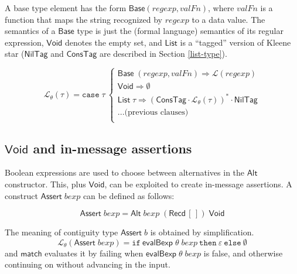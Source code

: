 \documentclass[a4paper,UKenglish,cleveref, autoref, thm-restate]{lipics-v2021}
\newcommand{\konst}[1]{\ensuremath{\mathsf{#1}}}
\newcommand{\Lang}[1]{\ensuremath{{\mathcal L}({#1})}}
\newcommand{\LangTheta}[1]{\ensuremath{{\mathcal L}_{\theta}({#1})}}
\newcommand{\itelse}[3]{\mbox{$\mathtt{if}\ {#1}\ \mathtt{then}\ {#2}\ \mathtt{else}\ {#3}$}}
\begin{document}
\begin{definition}

A base type element has the form
$\konst{Base}(\mathit{regexp},\mathit{valFn})$, where $\mathit{valFn}$
is a function that maps the string recognized by $\mathit{regexp}$ to
a data value.  The semantics of a \konst{Base} type is just the
(formal language) semantics of its regular expression, \konst{Void}
denotes the empty set, and \konst{List} is a ``tagged'' version of
Kleene star (\konst{NilTag} and \konst{ConsTag} are described in
Section \ref{list-type}).

\[
\LangTheta{\tau} =
\mathtt{case}\; \tau\
 \left\{
 \begin{array}{l}
 \konst{Base}\; (\mathit{regexp}, \mathit{valFn}) \Rightarrow  \Lang{\mathit{regexp}} \\

 \konst{Void} \Rightarrow  \emptyset \\

 \konst{List}\; \tau \Rightarrow
   (\konst{ConsTag}\cdot \LangTheta{\tau})^{*} \cdot \konst{NilTag} \\

 ... \text{(previous clauses)}  \\

 \end{array}
 \right.
\]
\end{definition}

\subsection{\konst{Void} and in-message assertions}\label{assert}

Boolean expressions are used to choose between alternatives in the
\konst{Alt} constructor.  This, plus \konst{Void}, can be exploited to
create in-message assertions. A construct
$\konst{Assert}\;\mathit{bexp}$ can be defined as follows:

\begin{definition}[\konst{Assert}]

\[
  \konst{Assert}\; \mathit{bexp} =
     \konst{Alt} \; \mathit{bexp} \; (\konst{Recd}\, [\,]) \; \konst{Void}
\]

\end{definition}

The meaning of contiguity type $\konst{Assert}\;b$ is obtained by simplification.
%
\[
\LangTheta{\konst{Assert}\; \mathit{bexp}} =
 \itelse{\konst{evalBexp}\;\theta\;\mathit{bexp}}
        {\varepsilon} {\emptyset}
\]
%
and \konst{match} evaluates it by failing when
$\konst{evalBexp}\;\theta\;\mathit{bexp}$ is false, and otherwise
continuing on without advancing in the input.
\end{document}
